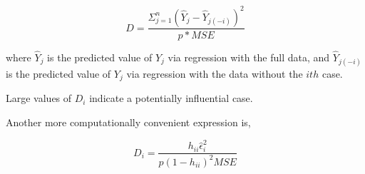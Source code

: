 \documentclass[10pt]{article}
\begin{document}
\begin{multicols}{3}
    \begin{equation}
        D = \frac{ \Sigma^n_{j=1} (\hat Y_j - \hat Y_{j(-i)})^2 }{p * MSE}
    \end{equation}

    where $\hat Y_j$ is the predicted value of $Y_j$ via regression with the full data, and $\hat Y_{j(-i)}$ is the predicted value of $Y_j$ via regression with the data without the $ith$ case.
    
    Large values of $D_i$ indicate a potentially influential case.

    Another more computationally convenient expression is,

    \begin{equation}
        D_i = \frac{h_{ii} \hat\epsilon_i^2}{ p (1 - h_{ii})^2 MSE}
    \end{equation}

\end{multicols}
\end{document}
